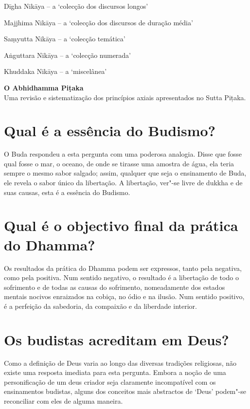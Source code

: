 \begin{packeditemize}
\item Dīgha Nikāya -- a `colecção dos discursos longos'
\item Majjhima Nikāya -- a `colecção dos discursos de duração média'
\item Saṃyutta Nikāya -- a `colecção temática'
\item Aṅguttara Nikāya -- a `colecção numerada'
\item Khuddaka Nikāya -- a `miscelânea'
\end{packeditemize}

\textbf{O Abhidhamma Piṭaka}\\
Uma revisão e sistematização dos princípios axiais apresentados no Sutta
Pițaka.

\section{Qual é a essência do Budismo?}

O Buda respondeu a esta pergunta com uma poderosa analogia. Disse que
fosse qual fosse o mar, o oceano, de onde se tirasse uma amostra de
água, ela teria sempre o mesmo sabor salgado; assim, qualquer que seja o
ensinamento de Buda, ele revela o sabor único da libertação. A
libertação, ver"-se livre de dukkha e de suas causas, esta é a essência
do Budismo.

\section{Qual é o objectivo final da prática do Dhamma?}

Os resultados da prática do Dhamma podem ser expressos, tanto pela
negativa, como pela positiva. Num sentido negativo, o resultado é a
libertação de todo o sofrimento e de todas as causas do sofrimento,
nomeadamente dos estados mentais nocivos enraizados na cobiça, no ódio e
na ilusão. Num sentido positivo, é a perfeição da sabedoria, da
compaixão e da liberdade interior.

\section{Os budistas acreditam em Deus?}

Como a definição de Deus varia ao longo das diversas tradições
religiosas, não existe uma resposta imediata para esta pergunta. Embora
a noção de uma personificação de um deus criador seja claramente
incompatível com os ensinamentos budistas, alguns dos conceitos mais
abstractos de `Deus' podem"-se reconciliar com eles de alguma maneira.

